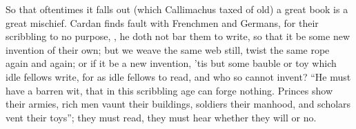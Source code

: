 So that oftentimes it falls out (which Callimachus taxed of old) a great book
is a great mischief. Cardan finds fault with Frenchmen and
Germans, for their scribbling to no purpose, , he doth not bar them to write, so that it be
some new invention of their own; but we weave the same web still, twist the
same rope again and again; or if it be a new invention, 'tis but some bauble or
toy which idle fellows write, for as idle fellows to read, and who so cannot
invent? \enquote{He must have a barren wit, that in this scribbling
age can forge nothing. Princes show their armies, rich men
vaunt their buildings, soldiers their manhood, and scholars vent their toys};
they must read, they must hear whether they will or no.



